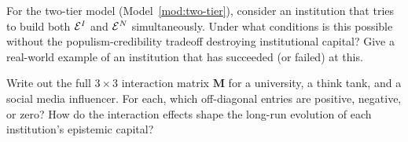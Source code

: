 \begin{exercise}
For the two-tier model (Model~\ref{mod:two-tier}), consider an institution that tries to build both $\mathcal{E}^I$ and $\mathcal{E}^N$ simultaneously.
Under what conditions is this possible without the populism-credibility tradeoff destroying institutional capital?
Give a real-world example of an institution that has succeeded (or failed) at this.
\end{exercise}

\begin{exercise}
\label{ex:ch6-interaction}
Write out the full $3 \times 3$ interaction matrix $\bm{M}$ for a university, a think tank, and a social media influencer.
For each, which off-diagonal entries are positive, negative, or zero?
How do the interaction effects shape the long-run evolution of each institution's epistemic capital?
\end{exercise}
